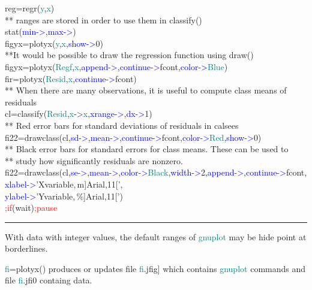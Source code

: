 \begin{example}[plotyxex]
reg=\textcolor{VioletRed}{regr}(\textcolor{teal}{y},\textcolor{teal}{x})\\ 
{\color{ForestGreen}** ranges are stored in order to use them in classify()}\\ 
\textcolor{VioletRed}{stat}(\textcolor{blue}{min->},\textcolor{blue}{max->})\\ 
figyx=\textcolor{VioletRed}{plotyx}(\textcolor{teal}{y},\textcolor{teal}{x},\textcolor{blue}{show->}0)\\ 
{\color{ForestGreen}**It would be possible to draw the regression function using draw()}\\ 
figyx=\textcolor{VioletRed}{plotyx}(\textcolor{teal}{Regf},\textcolor{teal}{x},\textcolor{blue}{append->},\textcolor{blue}{continue->}fcont,\textcolor{blue}{color->}\textcolor{teal}{Blue})\\ 
fir=\textcolor{VioletRed}{plotyx}(\textcolor{teal}{Resid},\textcolor{teal}{x},\textcolor{blue}{continue->}fcont)\\ 
{\color{ForestGreen}** When there are many observations, it is useful to compute class means of residuals}\\ 
cl=\textcolor{VioletRed}{classify}(\textcolor{teal}{Resid},\textcolor{teal}{x}->\textcolor{teal}{x},\textcolor{blue}{xrange->},\textcolor{blue}{dx->}1)\\ 
{\color{ForestGreen}** Red error bars for standard deviations of residuals in calsees}\\ 
fi22=\textcolor{VioletRed}{drawclass}(cl,\textcolor{blue}{sd->},\textcolor{blue}{mean->},\textcolor{blue}{continue->}fcont,\textcolor{blue}{color->}\textcolor{teal}{Red},\textcolor{blue}{show->}0)\\ 
{\color{ForestGreen}** Black error bars for standard errors for class means. These can be used to}\\ 
{\color{ForestGreen}** study how significantly residuals are nonzero.}\\ 
fi22=\textcolor{VioletRed}{drawclass}(cl,\textcolor{blue}{se->},\textcolor{blue}{mean->},\textcolor{blue}{color->}\textcolor{teal}{Black},\textcolor{blue}{width->}2,\textcolor{blue}{append->},\textcolor{blue}{continue->}fcont,\\ 
\textcolor{blue}{xlabel->}'Xvariable,\,m]Arial,11[',\\ 
\textcolor{blue}{ylabel->}'Yvariable,\,\%]Arial,11[')\\ 
\textcolor{Red}{;if}(wait)\textcolor{Red}{;pause}\\ 
\end{example} 
\vspace{-7mm} \rule{5cm}{0.1pt} 
\onehalfspacing 
\begin{note} 
With data with integer values, the default ranges of \textcolor{teal}{gnuplot} may be hide point at 
borderlines. 
\end{note} 
\begin{note} 
\textcolor{teal}{fi}=\textcolor{VioletRed}{plotyx}() produces or updates file \textcolor{teal}{fi}.jfig] which contains 
\textcolor{teal}{gnuplot} commands and file \textcolor{teal}{fi}.jfi0 containg data. 
\end{note} 
